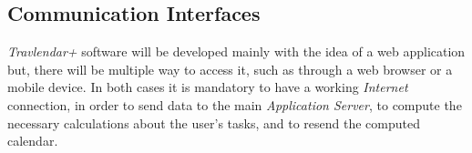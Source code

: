 \subsection{Communication Interfaces}
\emph{Travlendar+} software will  be developed mainly with the idea of a web application but, there will be multiple way to access it, such as through a web browser or a mobile device. In both cases it is mandatory to have a working \emph{Internet} connection, in order to send data to the main \emph{Application Server}, to compute the necessary calculations about the user's tasks, and to resend the computed calendar.